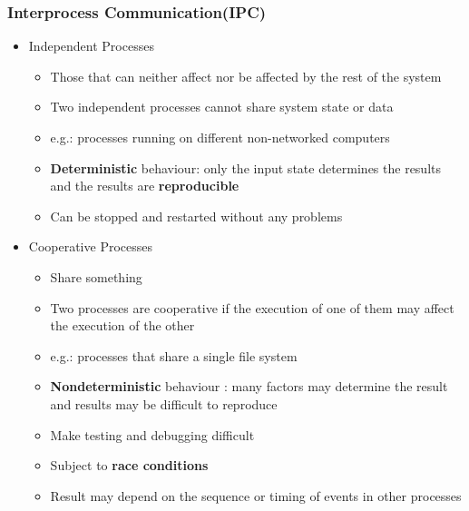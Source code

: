 \documentclass[11pt]{article}
\theoremstyle{definition}
\begin{document}
        \subsubsection{Interprocess Communication(IPC)}
            \begin{itemize}
                \item Independent Processes
                    \begin{itemize}
                        \item Those that can neither affect nor be affected by the rest of the system
                        \item Two independent processes cannot share system state or data
                        \item e.g.: processes running on different non-networked computers
                        \item \textbf{Deterministic} behaviour: only the input state determines the results and the results are \textbf{reproducible}
                        \item Can be stopped and restarted without any problems
                    \end{itemize}
                \item Cooperative Processes
                    \begin{itemize}
                        \item Share something
                        \item Two processes are cooperative if the execution of one of them may affect the execution of the other
                        \item e.g.: processes that share a single file system
                        \item \textbf{Nondeterministic} behaviour : many factors may determine the result and results may be difficult to reproduce
                        \item Make testing and debugging difficult
                        \item Subject to \textbf{race conditions}
                        \item Result may depend on the sequence or timing of events in other processes
                    \end{itemize}
            \end{itemize}
\end{document}

